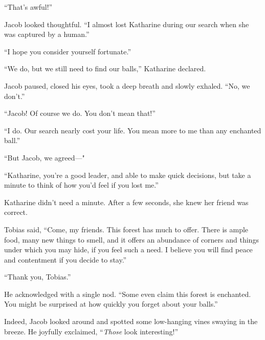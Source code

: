 “That's awful!”

Jacob looked thoughtful. “I almost lost Katharine during our search when she was captured by a human.”

“I hope you consider yourself fortunate.”

“We do, but we still need to find our balls,” Katharine declared.

Jacob paused, closed his eyes, took a deep breath and slowly exhaled. “No, we don't.”

“Jacob! Of course we do. You don't mean that!”

“I do. Our search nearly cost your life. You mean more to me than any enchanted ball.”

“But Jacob, we agreed—"

“Katharine, you're a good leader, and able to make quick decisions, but take a minute to think of how you'd feel if you lost me.”

Katharine didn't need a minute. After a few seconds, she knew her friend was correct.

Tobias said, “Come, my friends. This forest has much to offer. There is ample food, many new things to smell, and it offers an abundance of corners and things under which you may hide, if you feel such a need. I believe you will find peace and contentment if you decide to stay.”

“Thank you, Tobias.”

He acknowledged with a single nod. “Some even claim this forest is enchanted. You might be surprised at how quickly you forget about your balls.”

Indeed, Jacob looked around and spotted some low-hanging vines swaying in the breeze. He joyfully exclaimed, “\textit{Those} look interesting!”